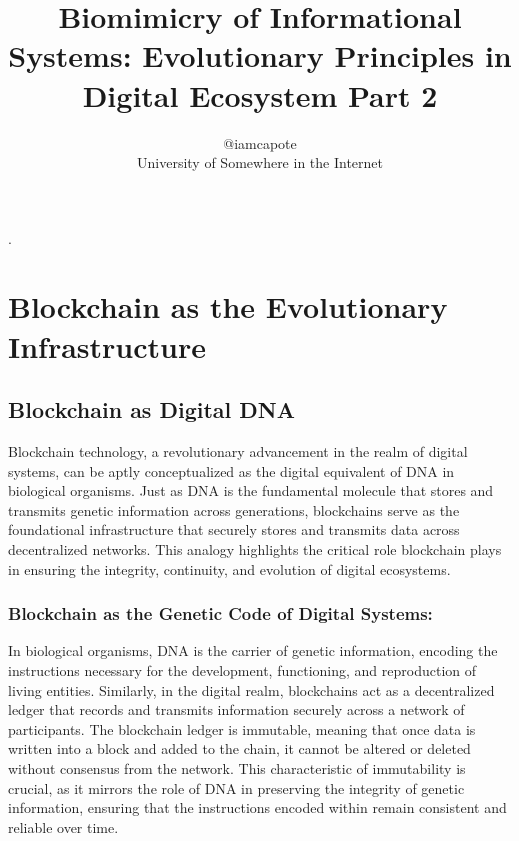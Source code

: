 \documentclass[12pt,twoside]{article}
\begin{document}
\onecolumn
\title{Biomimicry of Informational Systems: Evolutionary Principles in Digital Ecosystem Part 2}
\author{@iamcapote \\ \small University of Somewhere in the Internet}
\date{\vspace{-5ex}} %
\maketitle
\tableofcontents
\newpage.



\section{Blockchain as the Evolutionary Infrastructure}

\subsection{Blockchain as Digital DNA}

Blockchain technology, a revolutionary advancement in the realm of digital systems, can be aptly conceptualized as the digital equivalent of DNA in biological organisms. Just as DNA is the fundamental molecule that stores and transmits genetic information across generations, blockchains serve as the foundational infrastructure that securely stores and transmits data across decentralized networks. This analogy highlights the critical role blockchain plays in ensuring the integrity, continuity, and evolution of digital ecosystems.

\subsubsection{Blockchain as the Genetic Code of Digital Systems:}

In biological organisms, DNA is the carrier of genetic information, encoding the instructions necessary for the development, functioning, and reproduction of living entities. Similarly, in the digital realm, blockchains act as a decentralized ledger that records and transmits information securely across a network of participants. The blockchain ledger is immutable, meaning that once data is written into a block and added to the chain, it cannot be altered or deleted without consensus from the network. This characteristic of immutability is crucial, as it mirrors the role of DNA in preserving the integrity of genetic information, ensuring that the instructions encoded within remain consistent and reliable over time.
\end{document}
